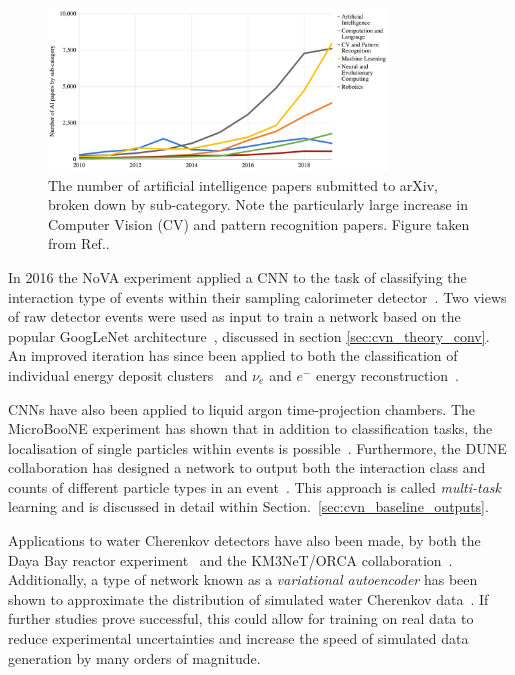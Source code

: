 \begin{figure} %
    \includegraphics[width=0.8\textwidth]{diagrams/6-cvn/papers.png}
    \caption[papers short]
    {The number of artificial intelligence papers submitted to arXiv, broken down by sub-category.
        Note the particularly large increase in Computer Vision (CV) and pattern recognition
        papers. Figure taken from Ref.\cite{perrault2019}.}
    \label{fig:papers}
\end{figure}

In 2016 the NoVA experiment applied a CNN to the task of classifying the interaction type of
events within their sampling calorimeter detector~\cite{aurisano2016}. Two views of raw detector
events were used as input to train a network based on the popular GoogLeNet
architecture~\cite{szegedy2015}, discussed in section \ref{sec:cvn_theory_conv}. An improved
iteration has since been applied to both the classification of individual energy deposit
clusters~\cite{psihas2019} and $\nu_{e}$ and $e^{-}$ energy reconstruction~\cite{baldi2019}.

CNNs have also been applied to liquid argon time-projection chambers. The MicroBooNE experiment
has shown that in addition to classification tasks, the localisation of single particles within
events is possible~\cite{acciarri2017}. Furthermore, the DUNE collaboration has designed a network
to output both the interaction class and counts of different particle types in an
event~\cite{collaboration2020, abi2020}. This approach is called \emph{multi-task} learning and is
discussed in detail within Section.~\ref{sec:cvn_baseline_outputs}.

Applications to water Cherenkov detectors have also been made, by both the Daya Bay reactor
experiment~\cite{racah2016} and the KM3NeT/ORCA collaboration~\cite{aiello2020}. Additionally, a
type of network known as a \emph{variational autoencoder} has been shown to approximate the
distribution of simulated water Cherenkov data~\cite{abhishek2019}. If further studies prove
successful, this could allow for training on real data to reduce experimental uncertainties and
increase the speed of simulated data generation by many orders of magnitude.

